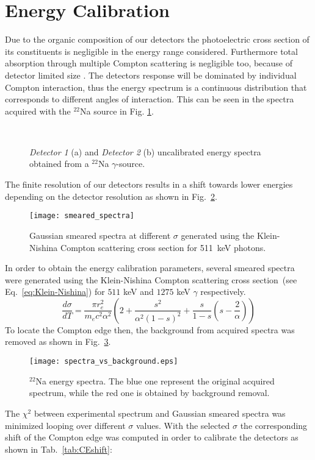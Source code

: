
\section*{Energy Calibration}

Due to the organic composition of our detectors the photoelectric cross section of its constituents is negligible in the energy range considered. Furthermore total absorption through multiple Compton scattering is negligible too, because of detector limited size . The detectors response will be dominated by individual Compton interaction, thus the energy spectrum is a continuous distribution that corresponds to different angles of interaction. This can be seen in the spectra acquired with the $^{22}$Na source in Fig. \ref{fig: uncalibrated energy spectra}.

\begin{figure}[h!]
\centering
{} \quad
{} \\
\caption{\emph{Detector 1} (a) and \emph{Detector 2} (b) uncalibrated energy spectra  obtained from a $^{22}$Na $\gamma$-source.}
\label{fig: uncalibrated energy spectra}
\end{figure}

The finite resolution of our detectors results in a shift towards lower energies depending on the detector resolution as shown in Fig.~\ref{fig: smeared spectra}.
\begin{figure}[h!]
\centering
\texttt{[image: smeared\_spectra]}
\caption{Gaussian smeared spectra at different $\sigma$ generated using the  Klein-Nishina Compton scattering cross section  for 511~keV photons.}
\label{fig: smeared spectra}
\end{figure}

In order to obtain the energy calibration parameters, several smeared spectra were generated using the  Klein-Nishina Compton scattering cross section~(see Eq.~\ref{eq:Klein-Nishina}) for $511$ keV and $1275$ keV $\gamma$ respectively.
\begin{equation}
\dfrac{d\sigma}{dT} = \dfrac{\pi r_e^2}{m_ec^2\alpha^2}\left(2+\dfrac{s^2}{\alpha^2(1-s)^2}+\dfrac{s}{1-s} \left(s-\dfrac{2}{\alpha}\right) \right)
\label{eq:Klein-Nishina}
\end{equation}
To locate the Compton edge then, the background from acquired spectra was removed  as shown in Fig.~\ref{fig: compton back}.
\begin{figure}[h!]
\centering
\texttt{[image: spectra\_vs\_background.eps]}
\caption{$^{22}$Na energy spectra. The blue one represent the original acquired spectrum, while the red one is obtained by background removal.}
\label{fig: compton back}
\end{figure}
The $\chi^2$ between experimental spectrum and Gaussian smeared spectra was minimized looping over different $\sigma$ values. With the selected $\sigma$ the corresponding shift of the Compton edge was computed in order to calibrate the detectors as shown in Tab.~\ref{tab:CEshift}:

